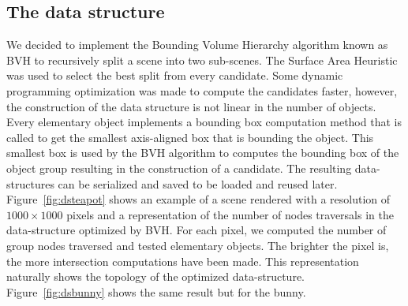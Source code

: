 \documentclass[acmsmall]{acmart}
\begin{document}
\subsection*{The data structure}
We decided to implement the Bounding Volume Hierarchy algorithm known as BVH to recursively split a scene into two sub-scenes.
The Surface Area Heuristic was used to select the best split from every candidate.
Some dynamic programming optimization was made to compute the candidates faster, however, the construction of the data structure is not linear in the number of objects.
Every elementary object implements a bounding box computation method that is called to get the smallest axis-aligned box that is bounding the object.
This smallest box is used by the BVH algorithm to computes the bounding box of the object group resulting in the construction of a candidate.
The resulting data-structures can be serialized and saved to be loaded and reused later.
Figure~\ref{fig:dsteapot} shows an example of a scene rendered with a resolution of $1000\times1000$ pixels and a representation of the number of nodes traversals in the data-structure optimized by BVH.
For each pixel, we computed the number of group nodes traversed and tested elementary objects. The brighter the pixel is, the more intersection computations have been made. This representation naturally shows the
topology of the optimized data-structure. Figure~\ref{fig:dsbunny} shows the same result but for the bunny.
\end{document}
